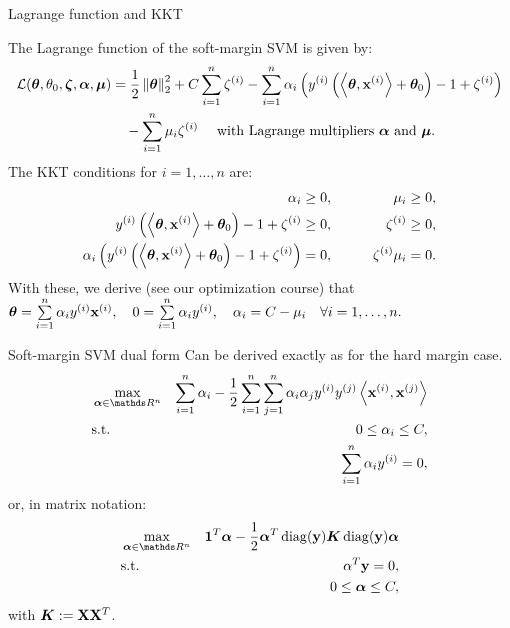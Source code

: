 \documentclass[11pt,compress,t,notes=noshow, xcolor=table]{beamer}
\begin{document}
\begin{vbframe}{Lagrange function and KKT}

\small
The Lagrange function of the soft-margin SVM is given by:
\begin{align*}
    \mathcal{L}(\bm{\theta}, \theta_0, \bm{\zeta}, \bm{\alpha}, \bm{\mu}) &= \frac{1}{2}\left\Vert\bm{\theta}\right\Vert^2_2 + C\sum\limits_{i=1}^n\zeta^{(i)} - \sum\limits_{i=1}^n \alpha_i\left(y^{(i)} \left( \left\langle \bm{\theta}, \mathbf{x}^{(i)} \right\rangle + \bm{\theta}_0 \right) -1 + \zeta^{(i)}\right) \\
    & \quad - \sum\limits_{i=1}^n \mu_i\zeta^{(i)} \quad\text{ with Lagrange multipliers $\bm{\alpha}$ and $\bm{\mu}.$}
\end{align*}
The KKT conditions for $i=1,\dots, n$ are:
\begin{eqnarray*}
    \alpha_i \geq 0, &\quad\quad&\mu_i \geq 0, \\
    y^{(i)} \left( \left\langle \bm{\theta}, \mathbf{x}^{(i)} \right\rangle + \bm{\theta}_0 \right) -1 + \zeta^{(i)} \geq 0, && \zeta^{(i)} \geq 0, \\
    \alpha_i\left(y^{(i)} \left( \left\langle \bm{\theta}, \mathbf{x}^{(i)} \right\rangle + \bm{\theta}_0 \right) -1 + \zeta^{(i)}\right)  = 0, && \zeta^{(i)}\mu_i = 0.
\end{eqnarray*} 
With these, we derive (see our optimization course) that \\
$\bm{\theta} = \sum\limits_{i=1}^n \alpha_iy^{(i)}\mathbf{x}^{(i)}, \quad 0 = \sum\limits_{i=1}^n\alpha_iy^{(i)}, \quad \alpha_i = C - \mu_i\quad \forall i=1,\dots, n.$
\end{vbframe}

\begin{vbframe}{Soft-margin SVM dual form}
Can be derived exactly as for the hard margin case.
\begin{eqnarray*}
    & \max\limits_{\alphav \in \R^n} & \sum_{i=1}^n \alpha_i - \frac{1}{2}\sum_{i=1}^n\sum_{j=1}^n\alpha_i\alpha_j\yi y^{(j)} \scp{\xi}{\xv^{(j)}} \\
    & \text{s.t. } & 0 \le \alpha_i \le C, \\
    & \quad & \sum_{i=1}^n \alpha_i \yi = 0,
\end{eqnarray*}
or, in matrix notation:
\begin{eqnarray*}
  & \max\limits_{\alphav \in \R^n} &  \one^T \alphav - \frac{1}{2} \alphav^T \diag(\yv) \bm{K} \diag(\yv) \alphav \\
  & \text{s.t.} & \alpha^T \yv = 0, \\
  &  & 0 \leq \alphav \leq C,
\end{eqnarray*}
with $\bm{K}:=\mathbf{X} \mathbf{X}^T$.
\end{vbframe}
\end{document}
